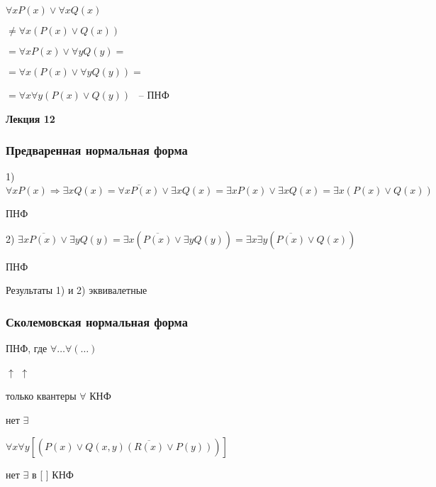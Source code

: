 \documentclass[russian]{lecture-notes}
\begin{document}
    \begin{example}
        $\forall x P(x) \lor \forall x Q(x)$

        $\neq \forall x (P(x) \lor Q(x))$

        $ = \forall x P(x) \lor \forall y Q(y) = $

        $= \forall x (P(x) \lor \forall y Q(y)) = $

        $= \forall x \forall y (P(x) \lor Q(y))$ ~-- ПНФ
    \end{example}
     \textbf{Лекция 12}

    \subsubsection{Предваренная нормальная форма}

    \begin{example}

        1) $\forall x P(x) \Rightarrow \exists x Q(x) = \overline{\forall x P(x)} \lor \exists x Q(x)
        = \exists x P(x) \lor \exists x Q(x) = \exists x
        ( P(x) \lor Q(x))$

    \quad ПНФ

        2) $\exists x \overline{P(x)} \lor \exists y Q(y) = \exists x (\overline{P(x)} \lor \exists y Q(y)) =
        \exists x \exists y (\overline{P(x)} \lor Q(x))$

    \qquad \qquad \qquad \qquad \qquad \qquad \qquad \qquad \qquad \qquad \qquad ПНФ

        Результаты 1) и 2) эквивалетные

    \end{example}

    \subsubsection{Сколемовская нормальная форма}

    \begin{definition}
        ПНФ, где $\forall \dots \forall (\dots)$

        \qquad \qquad \qquad \qquad \qquad \quad $\uparrow$ \qquad \quad $\uparrow$

        \qquad \quad  только квантеры $\forall$ \qquad КНФ

        \qquad \qquad \qquad нет $\exists$


        \end{definition}

    \begin{example}

        $\forall x \forall y [ (P(x) \lor \overline{Q(x,y)(R(x) \lor P(y))})]$

        нет $\exists$ в [ ] КНФ

        \end{example}
\end{document}

